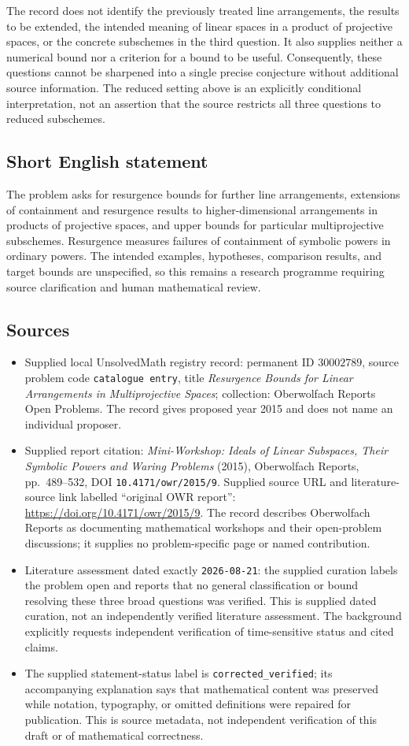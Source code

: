 \documentclass[11pt]{article}
\begin{document}
The record does not identify the previously treated line arrangements, the results to be extended, the intended meaning of linear spaces in a product of projective spaces, or the concrete subschemes in the third question. It also supplies neither a numerical bound nor a criterion for a bound to be useful. Consequently, these questions cannot be sharpened into a single precise conjecture without additional source information. The reduced setting above is an explicitly conditional interpretation, not an assertion that the source restricts all three questions to reduced subschemes.
\subsection{Short English statement}
The problem asks for resurgence bounds for further line arrangements, extensions of containment and resurgence results to higher-dimensional arrangements in products of projective spaces, and upper bounds for particular multiprojective subschemes. Resurgence measures failures of containment of symbolic powers in ordinary powers. The intended examples, hypotheses, comparison results, and target bounds are unspecified, so this remains a research programme requiring source clarification and human mathematical review.
\subsection{Sources}
\begin{itemize}
\item Supplied local UnsolvedMath registry record: permanent ID \(30002789\), source problem code \texttt{catalogue entry}, title \emph{Resurgence Bounds for Linear Arrangements in Multiprojective Spaces}; collection: Oberwolfach Reports Open Problems. The record gives proposed year 2015 and does not name an individual proposer.
\item Supplied report citation: \emph{Mini-Workshop: Ideals of Linear Subspaces, Their Symbolic Powers and Waring Problems} (2015), Oberwolfach Reports, pp.\ 489--532, DOI \texttt{10.4171/owr/2015/9}. Supplied source URL and literature-source link labelled ``original OWR report'': \url{https://doi.org/10.4171/owr/2015/9}. The record describes Oberwolfach Reports as documenting mathematical workshops and their open-problem discussions; it supplies no problem-specific page or named contribution.
\item Literature assessment dated exactly \texttt{2026-08-21}: the supplied curation labels the problem open and reports that no general classification or bound resolving these three broad questions was verified. This is supplied dated curation, not an independently verified literature assessment. The background explicitly requests independent verification of time-sensitive status and cited claims.
\item The supplied statement-status label is \texttt{corrected\_verified}; its accompanying explanation says that mathematical content was preserved while notation, typography, or omitted definitions were repaired for publication. This is source metadata, not independent verification of this draft or of mathematical correctness.
\end{itemize}
\end{document}
